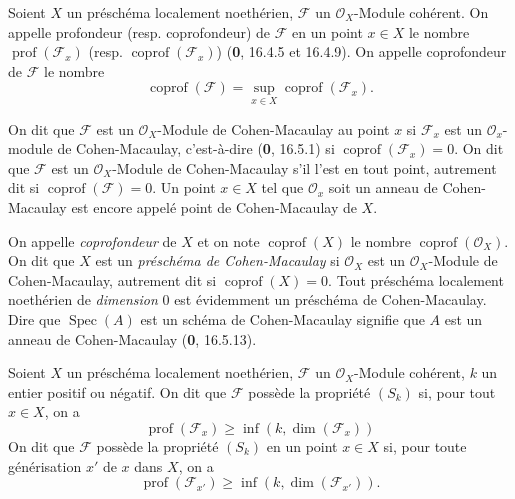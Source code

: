 \begin{definition}[5.7.1]
\label{IV.2.s5.7.1-fr}
Soient $X$ un préschéma localement noethérien, $\mathscr F$ un
$\mathcal O_X$-Module cohérent. On appelle profondeur \textup{(resp.}
coprofondeur\textup{)} de $\mathscr F$ en un point $x\in X$ le nombre
$\operatorname{prof}(\mathscr F_x)$ \textup{(resp.}
$\operatorname{coprof}(\mathscr F_x)$\textup{)} \textup{(\textbf{0}, 16.4.5 et 16.4.9)}. On appelle
coprofondeur de $\mathscr F$ le nombre
\begin{equation}
\operatorname{coprof}(\mathscr F)
=\sup_{x\in X}\operatorname{coprof}(\mathscr F_x).
\tag{7.5.1.1}\label{IV.2.s5.7.1.1-fr}
\end{equation}

On dit que $\mathscr F$ est un $\mathcal O_X$-Module de Cohen-Macaulay au
point $x$ si $\mathscr F_x$ est un $\mathcal O_x$-module de Cohen-Macaulay,
c'est-à-dire \textup{(\textbf{0}, 16.5.1)} si $\operatorname{coprof}(\mathscr F_x)=0$. On dit
que $\mathscr F$ est un $\mathcal O_X$-Module de Cohen-Macaulay s'il l'est
en tout point, autrement dit si $\operatorname{coprof}(\mathscr F)=0$. Un
point $x\in X$ tel que $\mathcal O_x$ soit un anneau de Cohen-Macaulay est
encore appelé point de Cohen-Macaulay de $X$.
\end{definition}

On appelle \emph{coprofondeur} de $X$ et on note $\operatorname{coprof}(X)$
le nombre $\operatorname{coprof}(\mathcal O_X)$. On dit que $X$ est un
\emph{préschéma de Cohen-Macaulay} si $\mathcal O_X$ est un
$\mathcal O_X$-Module de Cohen-Macaulay, autrement dit si
$\operatorname{coprof}(X)=0$. Tout préschéma localement noethérien de
\emph{dimension} 0 est évidemment un préschéma de Cohen-Macaulay. Dire que
$\operatorname{Spec}(A)$ est un schéma de Cohen-Macaulay signifie que $A$
est un anneau de Cohen-Macaulay (\textbf{0}, 16.5.13).

\begin{definition}[5.7.2]
\label{IV.2.s5.7.2-fr}
Soient $X$ un préschéma localement noethérien, $\mathscr F$ un
$\mathcal O_X$-Module cohérent, $k$ un entier positif ou négatif. On dit que
$\mathscr F$ possède la propriété $(S_k)$ si, pour tout $x\in X$, on a
\begin{equation}
\operatorname{prof}(\mathscr F_x)\geq
\inf(k,\dim(\mathscr F_x))
\tag{5.7.2.1}\label{IV.2.s5.7.2.1-fr}
\end{equation}
On dit que $\mathscr F$ possède la propriété $(S_k)$ en un point $x\in X$
si, pour toute générisation $x'$ de $x$ dans $X$, on a
\begin{equation}
\operatorname{prof}(\mathscr F_{x'})\geq
\inf(k,\dim(\mathscr F_{x'})).
\tag{5.7.2.2}\label{IV.2.s5.7.2.2-fr}
\end{equation}
\end{definition}

